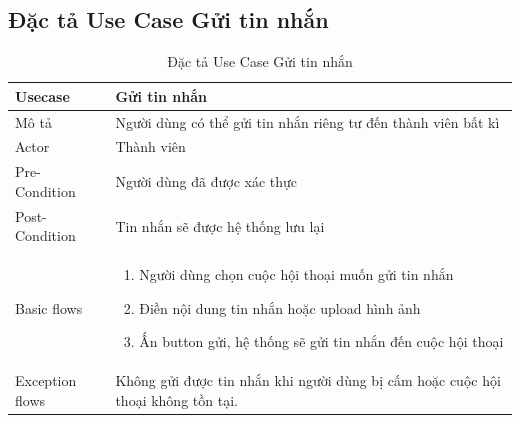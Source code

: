 \documentclass[../index.tex]{subfiles}
\begin{document}
    \subsection{Đặc tả Use Case Gửi tin nhắn}
    \begin{table}[H]
        \centering
        {}
        \begin{tabular}{ |p{3cm}|p{9cm}| }
            \hline
            Usecase         & Gửi tin nhắn                                                                                                                                                                                                \\
            \hline
            Mô tả           & Người dùng có thể gửi tin nhắn riêng tư đến thành viên bất kì                                                                                                                                               \\
            \hline
            Actor           & Thành viên                                                                                                                                                                                                  \\
            \hline
            Pre-Condition   & Người dùng đã được xác thực                                                                                                                                                                                 \\
            \hline
            Post-Condition  & Tin nhắn sẽ được hệ thống lưu lại                                                                                                                                                                           \\
            \hline
            Basic flows     & \begin{enumerate}\item Người dùng chọn cuộc hội thoại muốn gửi tin nhắn

\item Điền nội dung tin nhắn hoặc upload hình ảnh

\item Ấn button gửi, hệ thống sẽ gửi tin nhắn đến cuộc hội thoại\end{enumerate} \\
            \hline
            Exception flows & Không gửi được tin nhắn khi người dùng bị cấm hoặc cuộc hội thoại không tồn tại.                                                                                                                            \\
            \hline
        \end{tabular}
        \caption{Đặc tả Use Case Gửi tin nhắn}
    \end{table}
\end{document}
